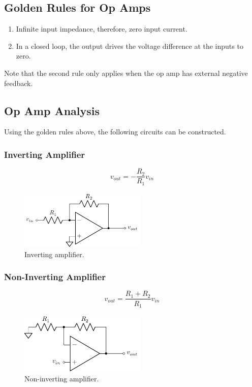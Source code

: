 \documentclass{article}
\begin{document}
\subsection{Golden Rules for Op Amps}
\begin{enumerate}
    \item Infinite input impedance, therefore, zero input current.
    \item In a closed loop, the output drives the voltage difference at the inputs to zero.
\end{enumerate}
Note that the second rule only applies when the op amp has external negative feedback.
\subsection{Op Amp Analysis}
Using the golden rules above, the following circuits can be constructed.
\subsubsection{Inverting Amplifier}
\begin{equation*}
    v_{out} = -\frac{R_2}{R_1}v_{in}
\end{equation*}
\begin{figure}[H]
    \centering
    \includegraphics[width = 6cm, keepaspectratio = true]{figures/inverting_amplifier.pdf}
    \caption{Inverting amplifier.}
\end{figure}
\subsubsection{Non-Inverting Amplifier}
\begin{equation*}
    v_{out} = \frac{R_1 + R_2}{R_1}v_{in}
\end{equation*}
\begin{figure}[H]
    \centering
    \includegraphics[width = 6cm, keepaspectratio = true]{figures/non_inverting_amplifier.pdf}
    \caption{Non-inverting amplifier.}
\end{figure}
\end{document}
